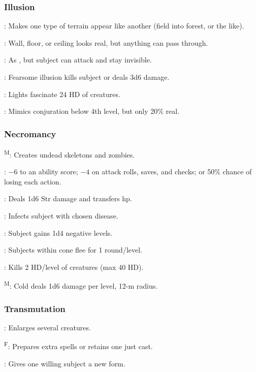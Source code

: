 \subsubsection{Illusion}
	: Makes one type of terrain appear like another (field into forest, or the like).

	: Wall, floor, or ceiling looks real, but anything can pass through.

	: As , but subject can attack and stay invisible.

	: Fearsome illusion kills subject or deals 3d6 damage.

	: Lights fascinate 24 HD of creatures.

	: Mimics conjuration below 4th level, but only 20\% real.

\subsubsection{Necromancy}
	\textsuperscript{M}: Creates undead skeletons and zombies.

	: $-6$ to an ability score; $-4$ on attack rolls, saves, and checks; or 50\% chance of losing each action.

	: Deals 1d6 Str damage and transfers hp. %

	: Infects subject with chosen disease.

	: Subject gains 1d4 negative levels.

	: Subjects within cone flee for 1 round/level.

	: Kills 2 HD/level of creatures (max 40 HD). %

	\textsuperscript{M}: Cold deals 1d6 damage per level, 12-m radius. %

\subsubsection{Transmutation}
	: Enlarges several creatures.

	\textsuperscript{F}: Prepares extra spells or retains one just cast.

	: Gives one willing subject a new form.

